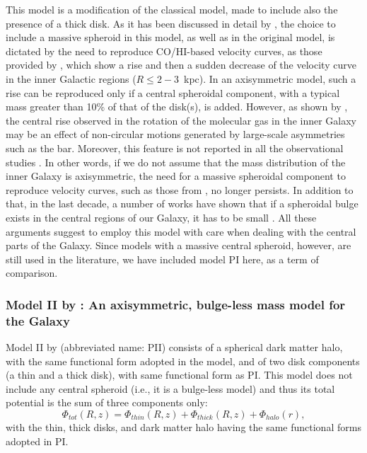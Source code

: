         This model is a modification of the classical \citet{1991RMxAA..22..255A} model, made to include also the presence of a thick disk. As it has been discussed in detail by \citet{2017A&A...598A..66P}, the choice to include  a massive spheroid in this model, as well as in the original \citet{1991RMxAA..22..255A} model, is dictated by the need to reproduce CO/HI-based velocity curves, as those provided by \citet{2012PASJ...64...75S}, which show a rise and then a sudden decrease of the velocity curve in the inner Galactic regions ($R \le 2-3$~kpc). In an axisymmetric model, such a rise can be reproduced only if a central spheroidal component, with a typical mass greater than 10\% of that of the disk(s), is added. However, as shown by \citet{2015A&A...578A..14C}, the central rise observed in the rotation of the molecular gas in the inner Galaxy may be an effect of non-circular motions generated by large-scale asymmetries such as the bar. Moreover, this feature is not reported in all the observational studies \citep[see, e.g., ][on which model PII is based]{2014ApJ...783..130R}. In other words, if we do not assume that the mass distribution of the inner Galaxy is axisymmetric, the need for a massive spheroidal component to reproduce velocity curves, such as those from \citet{2012PASJ...64...75S}, no longer persists. In addition to that, in the last decade, a number of works  have shown that if a spheroidal bulge exists in the central regions of our Galaxy, it has to be small \citep[few percents of the mass of the disk at the most, see among others][]{2010ApJ...720L..72S, 2012AJ....143...57K, 2015A&A...577A...1D, 2018A&A...615A.100G}. All these arguments suggest to employ this model \citep[as well as all models including a massive central spheroid; see, e.g.,][]{2013A&A...549A.137I} with care when dealing with the central parts of the Galaxy. Since models with a massive central spheroid, however, are still used in the literature, we have included model PI here, as a term of comparison.    



    \subsubsection{Model II by \citet{2017A&A...598A..66P}: An axisymmetric, bulge-less mass model for the Galaxy}

        Model II by \citet{2017A&A...598A..66P} (abbreviated name: PII) consists of a spherical dark matter halo, with the same functional form adopted in the \citet{1991RMxAA..22..255A} model, and of two disk components (a thin and a thick disk), with same functional form as PI. This model does not include any central spheroid (i.e., it is a bulge-less model) and thus its total potential is the sum of three components only:
        \begin{equation}
            \Phi_{tot}(R, z) = \Phi_{thin}(R, z) + \Phi_{thick}(R, z) + \Phi_{halo}(r),
        \end{equation}
        with the thin, thick disks, and dark matter halo having the same functional forms adopted in PI.

